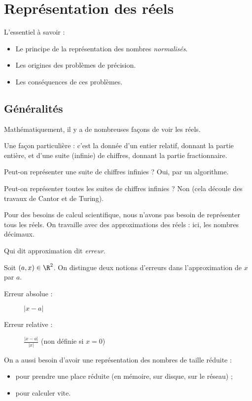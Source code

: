 \section{Représentation des réels}

L'essentiel à savoir :
\begin{itemize}
\item[\textbullet] Le principe de la représentation des nombres \emph{normalisés}.
\item[\textbullet] Les origines des problèmes de précision.
\item[\textbullet] Les conséquences de ces problèmes.
\end{itemize}
\subsection{Généralités}
Mathématiquement, il y a de nombreuses façons de voir les réels.

Une façon particulière : c'est la donnée d'un entier relatif, donnant la partie entière, et d'une
suite (infinie) de chiffres, donnant la partie fractionnaire.

Peut-on représenter une suite de chiffres infinies ? Oui, par un algorithme.

Peut-on représenter toutes les suites de chiffres infinies ? Non (cela découle des travaux de Cantor et de  Turing).

Pour des besoins de calcul scientifique, nous n'avons pas besoin de représenter tous les réels. On travaille avec des approximations des réels : ici, les nombres décimaux.
\begin{rem}
  Qui dit approximation dit \emph{erreur}.
\end{rem}
\begin{defi}
Soit $(a,x)\in\R^2$. On distingue deux notions d'erreurs dans l'approximation de $x$ par $a$.
\begin{description}
\item[Erreur absolue :] $|x-a|$ 
\item[Erreur relative :]  $\displaystyle\frac{|x-a|}{|x|}$ (non définie si $x=0$)
\end{description}
\end{defi}
On a aussi besoin d'avoir une représentation des nombres de taille réduite :
\begin{itemize}
\item[\textbullet] pour prendre une place réduite (en mémoire, sur disque, sur le réseau) ;
\item[\textbullet] pour calculer vite.
\end{itemize}


